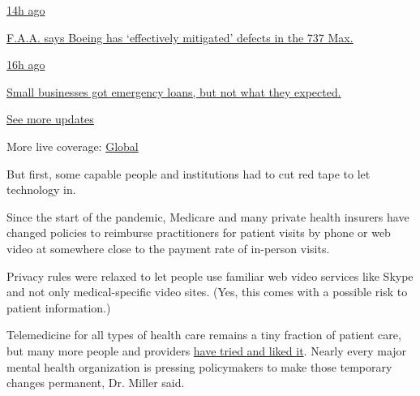 \href{https://www.nytimes3xbfgragh.onion/live/2020/08/03/business/stock-market-today-coronavirus?action=click\&pgtype=Article\&state=default\&region=MAIN_CONTENT_1\&context=storylines_live_updates\#faa-says-boeing-has-effectively-mitigated-defects-in-the-737-max}{14h
ago}

\href{https://www.nytimes3xbfgragh.onion/live/2020/08/03/business/stock-market-today-coronavirus?action=click\&pgtype=Article\&state=default\&region=MAIN_CONTENT_1\&context=storylines_live_updates\#faa-says-boeing-has-effectively-mitigated-defects-in-the-737-max}{F.A.A.
says Boeing has `effectively mitigated' defects in the 737 Max.}

\href{https://www.nytimes3xbfgragh.onion/live/2020/08/03/business/stock-market-today-coronavirus?action=click\&pgtype=Article\&state=default\&region=MAIN_CONTENT_1\&context=storylines_live_updates\#small-businesses-got-emergency-loans-but-not-what-they-expected}{16h
ago}

\href{https://www.nytimes3xbfgragh.onion/live/2020/08/03/business/stock-market-today-coronavirus?action=click\&pgtype=Article\&state=default\&region=MAIN_CONTENT_1\&context=storylines_live_updates\#small-businesses-got-emergency-loans-but-not-what-they-expected}{Small
businesses got emergency loans, but not what they expected.}

\href{https://www.nytimes3xbfgragh.onion/live/2020/08/03/business/stock-market-today-coronavirus?action=click\&pgtype=Article\&state=default\&region=MAIN_CONTENT_1\&context=storylines_live_updates}{See
more updates}

More live coverage:
\href{https://www.nytimes3xbfgragh.onion/2020/08/04/world/coronavirus-covid-19.html?action=click\&pgtype=Article\&state=default\&region=MAIN_CONTENT_1\&context=storylines_live_updates}{Global}

But first, some capable people and institutions had to cut red tape to
let technology in.

Since the start of the pandemic, Medicare and many private health
insurers have changed policies to reimburse practitioners for patient
visits by phone or web video at somewhere close to the payment rate of
in-person visits.

Privacy rules were relaxed to let people use familiar web video services
like Skype and not only medical-specific video sites. (Yes, this comes
with a possible risk to patient information.)

Telemedicine for all types of health care remains a tiny fraction of
patient care, but many more people and providers
\href{https://www.nytimes3xbfgragh.onion/2020/07/09/well/mind/teletherapy-mental-health-coronavirus.html}{have
tried and liked it}. Nearly every major mental health organization is
pressing policymakers to make those temporary changes permanent, Dr.
Miller said.

